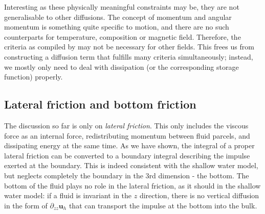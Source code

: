 Interesting as these physically meaningful constraints may be, they are not generalisable to other diffusions. The concept of momentum and angular momentum is something quite specific to motion, and there are no such counterparts for temperature, composition or magnetic field. Therefore, the criteria as compiled by \textcite{shchepetkin_physically_1996} may not be necessary for other fields. This frees us from constructing a diffusion term that fulfills many criteria simultaneously; instead, we mostly only need to deal with dissipation (or the corresponding storage function) properly.

\subsection{Lateral friction and bottom friction}

The discussion so far is only on \textit{lateral friction}. This only includes the viscous force as an internal force, redistributing momentum between fluid parcels, and dissipating energy at the same time. As we have shown, the integral of a proper lateral friction can be converted to a boundary integral describing the impulse exerted at the boundary. This is indeed consistent with the shallow water model, but neglects completely the boundary in the 3rd dimension - the bottom. The bottom of the fluid plays no role in the lateral friction, as it should in the shallow water model: if a fluid is invariant in the $z$ direction, there is no vertical diffusion in the form of $\partial_{zz} \mathbf{u}_h$ that can transport the impulse at the bottom into the bulk.

